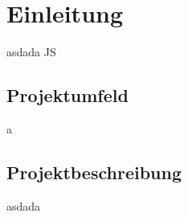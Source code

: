 \section{Einleitung}
	asdada
	\gls{JS}

\subsection{Projektumfeld}

a


\subsection{Projektbeschreibung}
	asdada